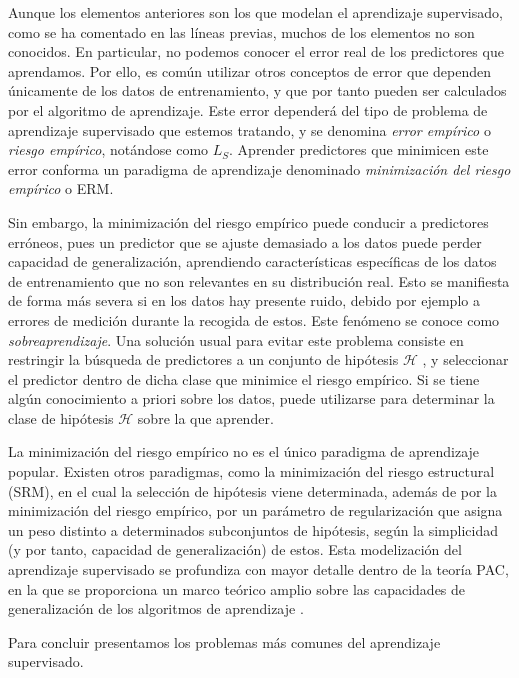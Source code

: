 Aunque los elementos anteriores son los que modelan el aprendizaje supervisado, como se ha comentado en las líneas previas, muchos de los elementos no son conocidos. En particular, no podemos conocer el error  real de los predictores que aprendamos. Por ello, es común utilizar otros conceptos de error que dependen únicamente de los datos de entrenamiento, y que por tanto pueden ser calculados por el algoritmo de aprendizaje. Este error dependerá del tipo de problema de aprendizaje supervisado que estemos tratando, y se denomina \emph{error empírico} o \emph{riesgo empírico}, notándose como $L_S$. Aprender predictores que minimicen este error conforma un paradigma de aprendizaje denominado \emph{minimización del riesgo empírico} o ERM.

Sin embargo, la minimización del riesgo empírico puede conducir a predictores erróneos, pues un predictor que se ajuste demasiado a los datos puede perder capacidad de generalización, aprendiendo características específicas de los datos de entrenamiento que no son relevantes en su distribución real. Esto se manifiesta de forma más severa si en los datos hay presente ruido, debido por ejemplo a errores de medición durante la recogida de estos. Este fenómeno se conoce como \emph{sobreaprendizaje}. Una solución usual para evitar este problema consiste en restringir la búsqueda de predictores a un conjunto de hipótesis $\mathcal{H}$
, y seleccionar el predictor dentro de dicha clase que minimice el riesgo empírico. Si se tiene algún conocimiento a priori sobre los datos, puede utilizarse para determinar la clase de hipótesis $\mathcal{H}$ sobre la que aprender.

La minimización del riesgo empírico no es el único paradigma de aprendizaje popular. Existen otros paradigmas, como la minimización del riesgo estructural (SRM), en el cual la selección de hipótesis viene determinada, además de por la minimización del riesgo empírico, por un parámetro de regularización que asigna un peso distinto a determinados subconjuntos de hipótesis, según la simplicidad (y por tanto, capacidad de generalización) de estos. Esta modelización del aprendizaje supervisado se profundiza con mayor detalle dentro de la teoría PAC, en la que se proporciona un marco teórico amplio sobre las capacidades de generalización de los algoritmos de aprendizaje \cite{understandingml}.

Para concluir presentamos los problemas más comunes del aprendizaje supervisado.

